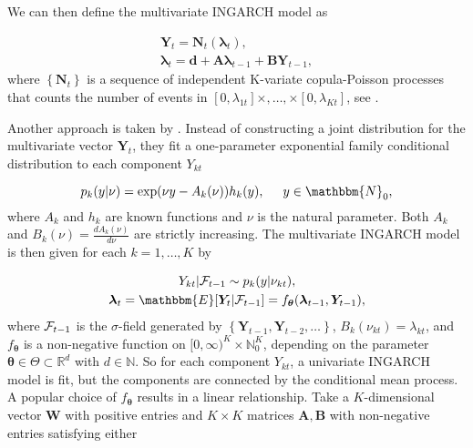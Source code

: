 We can then define the multivariate INGARCH model as

\begin{equation}
\begin{gathered}
\bm{Y}_t = \bm{N}_t(\bm{\lambda}_t), \\
\bm{\lambda}_t = \bm{d} + \bm{A}\bm{\lambda}_{t-1} + \bm{B}\bm{Y}_{t-1},
\label{eq:Mingarch 1 new}
\end{gathered}
\end{equation}
%
where $\left\{\bm{N}_t\right\}$ is a sequence of independent K-variate copula-Poisson processes that counts the number of events in $[0,\lambda_{1t}]\times,\ldots,\times[0,\lambda_{Kt}]$, see \textcite{Fokianos:2020}. 

Another approach is taken by \textcite{Lee:2023}. Instead of constructing a joint distribution for the multivariate vector $\bm{Y}_t$, they fit a one-parameter exponential family conditional distribution to each component $Y_{kt}$

\begin{equation}
p_{k}(y|\nu) = \exp(\nu y - A_k(\nu))h_k(y), \hspace{0.5cm} y \in \mathbbm{N}_0,
\label{eq:Exponential Family}
\end{equation}
where $A_k$ and $h_k$ are known functions and $\nu$ is the natural parameter. Both $A_k$ and $B_k(\nu) = \frac{d A_k(\nu)}{d \nu}$ are strictly increasing. The multivariate INGARCH model is then given for each $k=1,\ldots,K$ by

\begin{equation}
\begin{gathered}
Y_{kt} | \SigA_{t-1} \sim p_k(y|\nu_{kt}), \\
\bm{\lambda}_t = \mathbbm{E}[\bm{Y}_t | \SigA_{t-1}] = f_{\bm{\theta}}(\bm{\lambda}_{t-1},\bm{Y}_{t-1}),
\label{eq:Mingarch 2}
\end{gathered}
\end{equation}
%
where $\mathcal{F}_{t-1}$ is the $\sigma$-field generated by $\left\{\bm{Y}_{t-1},\bm{Y}_{t-2},\ldots\right\}$, $B_k(\nu_{kt})=\lambda_{kt}$, and $f_{\bm{\theta}}$ is a non-negative function on $[0,\infty)^K \times \mathbb{N}_0^K$, depending on the parameter $\bm{\theta} \in \Theta \subset \mathbb{R}^d$ with $d \in \mathbb{N}$. So for each component $Y_{kt}$, a univariate INGARCH model is fit, but the components are connected by the conditional mean process. A popular choice of $f_{\bm{\theta}}$ results in a linear relationship. Take a $K$-dimensional vector $\bm{W}$ with positive entries and $K\times K$ matrices $\bm{A},\bm{B}$ with non-negative entries satisfying either

